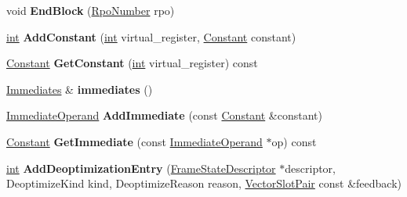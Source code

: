 \begin{DoxyCompactItemize}
void {\bfseries End\+Block} (\mbox{\hyperlink{classv8_1_1internal_1_1compiler_1_1RpoNumber}{Rpo\+Number}} rpo)
\item 
\mbox{\label{classv8_1_1internal_1_1compiler_1_1InstructionSequence_a6a3a3108e144a07b260d0460cb0f3d05}} 
\mbox{\hyperlink{classint}{int}} {\bfseries Add\+Constant} (\mbox{\hyperlink{classint}{int}} virtual\+\_\+register, \mbox{\hyperlink{classv8_1_1internal_1_1compiler_1_1Constant}{Constant}} constant)
\item 
\mbox{\label{classv8_1_1internal_1_1compiler_1_1InstructionSequence_a3c581fba579d6ec63b6d3a32654c3c8b}} 
\mbox{\hyperlink{classv8_1_1internal_1_1compiler_1_1Constant}{Constant}} {\bfseries Get\+Constant} (\mbox{\hyperlink{classint}{int}} virtual\+\_\+register) const
\item 
\mbox{\label{classv8_1_1internal_1_1compiler_1_1InstructionSequence_a9538839b6dc50885c2cec28a1eae175d}} 
\mbox{\hyperlink{classv8_1_1internal_1_1ZoneVector}{Immediates}} \& {\bfseries immediates} ()
\item 
\mbox{\label{classv8_1_1internal_1_1compiler_1_1InstructionSequence_a8eef7894ee18da1ca41379ca1e396ccd}} 
\mbox{\hyperlink{classv8_1_1internal_1_1compiler_1_1ImmediateOperand}{Immediate\+Operand}} {\bfseries Add\+Immediate} (const \mbox{\hyperlink{classv8_1_1internal_1_1compiler_1_1Constant}{Constant}} \&constant)
\item 
\mbox{\label{classv8_1_1internal_1_1compiler_1_1InstructionSequence_a05471340edd207be7799b198f628646b}} 
\mbox{\hyperlink{classv8_1_1internal_1_1compiler_1_1Constant}{Constant}} {\bfseries Get\+Immediate} (const \mbox{\hyperlink{classv8_1_1internal_1_1compiler_1_1ImmediateOperand}{Immediate\+Operand}} $\ast$op) const
\item 
\mbox{\label{classv8_1_1internal_1_1compiler_1_1InstructionSequence_a9738bc1ed8589b1d6a4aefb58d62e23d}} 
\mbox{\hyperlink{classint}{int}} {\bfseries Add\+Deoptimization\+Entry} (\mbox{\hyperlink{classv8_1_1internal_1_1compiler_1_1FrameStateDescriptor}{Frame\+State\+Descriptor}} $\ast$descriptor, Deoptimize\+Kind kind, Deoptimize\+Reason reason, \mbox{\hyperlink{classv8_1_1internal_1_1VectorSlotPair}{Vector\+Slot\+Pair}} const \&feedback)

\end{DoxyCompactItemize}
